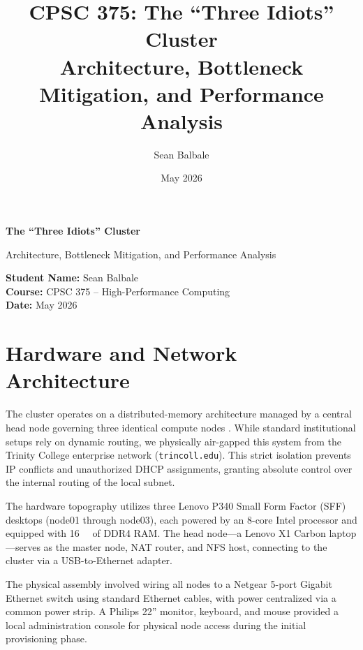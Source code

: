 \documentclass[11pt]{article}
\title{\textbf{CPSC 375: The ``Three Idiots'' Cluster}\\
Architecture, Bottleneck Mitigation, and Performance Analysis}
\author{Sean Balbale}
\date{May 2026}
\begin{document}
\begin{titlepage}
  \begin{center}
    \vspace*{1in}

    \Huge
    \textbf{The ``Three Idiots'' Cluster}

    \LARGE
    Architecture, Bottleneck Mitigation, and Performance Analysis

    \vspace{3in}

    \textbf{Student Name:} Sean Balbale
    \\ \textbf{Course:} CPSC 375 – High-Performance Computing
    \\ \textbf{Date:} May 2026

    \vfill

  \end{center}
\end{titlepage}

\newpage

\section{Hardware and Network Architecture}
The cluster operates on a distributed-memory architecture managed by a central head node governing three identical compute nodes . While standard institutional setups rely on dynamic routing, we physically air-gapped this system from the Trinity College enterprise network (\texttt{trincoll.edu}). This strict isolation prevents IP conflicts and unauthorized DHCP assignments, granting absolute control over the internal routing of the local subnet.

The hardware topography utilizes three Lenovo P340 Small Form Factor (SFF) desktops (node01 through node03), each powered by an 8-core Intel processor and equipped with \SI{16}{\giga\byte} of DDR4 RAM. The head node—a Lenovo X1 Carbon laptop—serves as the master node, NAT router, and NFS host, connecting to the cluster via a USB-to-Ethernet adapter.

The physical assembly involved wiring all nodes to a Netgear 5-port Gigabit Ethernet switch using standard Ethernet cables, with power centralized via a common power strip. A Philips 22” monitor, keyboard, and mouse provided a local administration console for physical node access during the initial provisioning phase.
\end{document}
